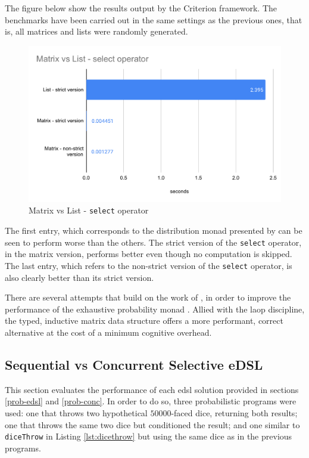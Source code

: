 \documentclass[
  oneside,
  11pt, a4paper,
  footinclude=true,
  headinclude=true,
  cleardoublepage=empty
]{scrbook}
\theoremstyle{definition}
\theoremstyle{definition}
\begin{document}
        The figure below show the results output by the Criterion framework. The benchmarks have been carried out in the same settings as the previous ones, that is, all matrices and lists were randomly generated.
        
            \begin{figure}[H]%
            \centering
             \includegraphics[width=\linewidth]{img/chart.pdf}
               \caption{Matrix vs List - \texttt{select} operator}
               \label{fig:bench2}
            \end{figure}
            
        The first entry, which corresponds to the distribution monad presented by \cite{erwig_kollmansberger_2006} can be seen to perform worse than the others. The strict version of the \texttt{select} operator, in the matrix version, performs better even though no computation is skipped. The last entry, which refers to the non-strict version of the \texttt{select} operator, is also clearly better than its strict version.
        
        There are several attempts that build on the work of \cite{erwig_kollmansberger_2006}, in order to improve the performance of the exhaustive probability monad \citep{larsen2011memory, dylus2018probabilistic}. Allied with the \gls{laop} discipline, the typed, inductive matrix data structure offers a more performant, correct alternative at the cost of a minimum cognitive overhead.
        
    \subsection{Sequential vs Concurrent Selective eDSL}
        This section evaluates the performance of each \gls{edsl} solution provided in sections \ref{prob-edsl} and \ref{prob-conc}. In order to do so, three probabilistic programs were used: one that throws two hypothetical $50000$-faced dice, returning both results; one that throws the same two dice but conditioned the result; and one similar to \texttt{diceThrow} in Listing \ref{lst:dicethrow} but using the same dice as in the previous programs. 
        
\end{document}
